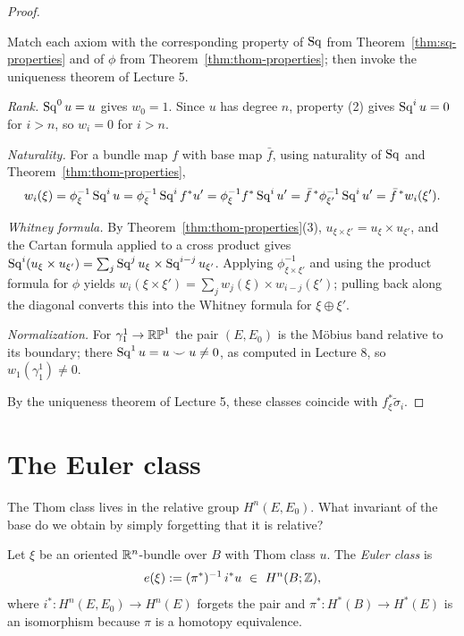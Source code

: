 \begin{proof}
\begin{strategy}
Match each axiom with the corresponding property of $\operatorname{Sq}$ from
Theorem~\ref{thm:sq-properties} and of $\phi$ from
Theorem~\ref{thm:thom-properties}; then invoke the uniqueness theorem of
Lecture 5.
\end{strategy}

 \emph{Rank.} $\operatorname{Sq}^0u=u$ gives $w_0=1$. Since $u$ has degree $n$,
property (2) gives $\operatorname{Sq}^iu=0$ for $i>n$, so $w_i=0$ for $i>n$.

 \emph{Naturality.} For a bundle map $f$ with base map $\bar f$, using
naturality of $\operatorname{Sq}$ and Theorem~\ref{thm:thom-properties},
\[
w_i(\xi)=\phi_\xi^{-1}\operatorname{Sq}^i u=\phi_\xi^{-1}\operatorname{Sq}^i f^*u'
=\phi_\xi^{-1}f^*\operatorname{Sq}^iu'=\bar f^{\,*}\phi_{\xi'}^{-1}\operatorname{Sq}^iu'
=\bar f^{\,*}w_i(\xi').
\]

 \emph{Whitney formula.} By Theorem~\ref{thm:thom-properties}(3),
$u_{\xi\times\xi'}=u_\xi\times u_{\xi'}$, and the Cartan formula applied to a
cross product gives
$\operatorname{Sq}^i(u_\xi\times u_{\xi'})=\sum_j\operatorname{Sq}^ju_\xi\times\operatorname{Sq}^{i-j}u_{\xi'}$. Applying
$\phi^{-1}_{\xi\times\xi'}$ and using the product formula for $\phi$ yields
$w_i(\xi\times\xi')=\sum_j w_j(\xi)\times w_{i-j}(\xi')$; pulling back along the
diagonal converts this into the Whitney formula for $\xi\oplus\xi'$.

 \emph{Normalization.} For $\gamma^1_1\to\mathbb{RP}^1$ the pair
$(E,E_0)$ is the M\"obius band relative to its boundary; there
$\operatorname{Sq}^1u=u\smile u\neq0$, as computed in Lecture 8, so $w_1(\gamma^1_1)\neq0$.

 By the uniqueness theorem of Lecture 5, these classes coincide with
$f_\xi^*\tilde\sigma_i$.
\end{proof}

\section{The Euler class}

\begin{guiding}
The Thom class lives in the relative group $H^n(E,E_0)$. What invariant of the
base do we obtain by simply forgetting that it is relative?
\end{guiding}

\begin{definition}
Let $\xi$ be an oriented $\mathbb{R}^n$-bundle over $B$ with Thom class $u$. The
\emph{Euler class} is
\[
e(\xi):=(\pi^*)^{-1}\,i^*u\ \in\ H^n(B;\Z),
\]
where $i^*\colon H^n(E,E_0)\to H^n(E)$ forgets the pair and
$\pi^*\colon H^*(B)\to H^*(E)$ is an isomorphism because $\pi$ is a homotopy
equivalence.
\end{definition}

